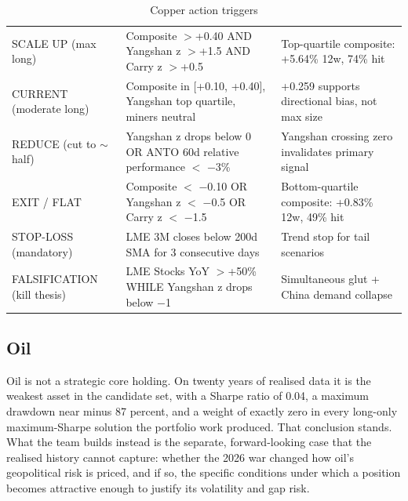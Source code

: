 \documentclass[11pt,a4paper]{article}
\begin{document}
\begin{table}[htbp]
\caption{Copper action triggers}
\small
\begin{tabularx}{\linewidth}{P{3.1cm} L P{4.4cm}}
\toprule
{} &  &  \\
\midrule
SCALE UP (max long) & Composite \(>\)+0.40 AND Yangshan z \(>\)+1.5 AND Carry z \(>\)+0.5 & Top-quartile composite: +5.64\% 12w, 74\% hit \\
CURRENT (moderate long) & Composite in [+0.10, +0.40], Yangshan top quartile, miners neutral & +0.259 supports directional bias, not max size \\
REDUCE (cut to \(\sim\)half) & Yangshan z drops below 0 OR ANTO 60d relative performance \(<\) \(-\)3\% & Yangshan crossing zero invalidates primary signal \\
EXIT / FLAT & Composite \(<\) \(-\)0.10 OR Yangshan z \(<\) \(-\)0.5 OR Carry z \(<\) \(-\)1.5 & Bottom-quartile composite: +0.83\% 12w, 49\% hit \\
STOP-LOSS (mandatory) & LME 3M closes below 200d SMA for 3 consecutive days & Trend stop for tail scenarios \\
FALSIFICATION (kill thesis) & LME Stocks YoY \(>\)+50\% WHILE Yangshan z drops below \(-\)1 & Simultaneous glut + China demand collapse \\
\bottomrule
\end{tabularx}
\end{table}

\clearpage
\subsection{Oil}

Oil is not a strategic core holding. On twenty years of realised data it is the weakest asset in the candidate set, with a Sharpe ratio of 0.04, a maximum drawdown near minus 87 percent, and a weight of exactly zero in every long-only maximum-Sharpe solution the portfolio work produced. That conclusion stands. What the team builds instead is the separate, forward-looking case that the realised history cannot capture: whether the 2026 war changed how oil's geopolitical risk is priced, and if so, the specific conditions under which a position becomes attractive enough to justify its volatility and gap risk.
\end{document}
